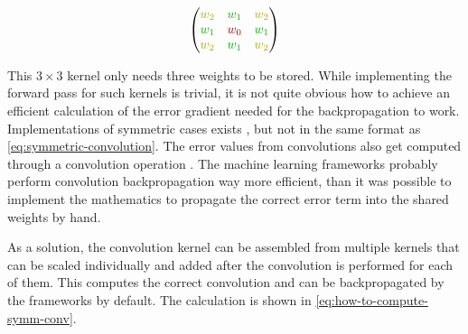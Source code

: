 \begin{equation}
    \label{eq:symmetric-convolution}
    \left(\begin{matrix}
        \textcolor{textyellow}{w_2} & \textcolor{textgreen}{w_1} & \textcolor{textyellow}{w_2}\\
        \textcolor{textgreen}{w_1} & \textcolor{textred}{w_0} & \textcolor{textgreen}{w_1}\\
        \textcolor{textyellow}{w_2} & \textcolor{textgreen}{w_1} & \textcolor{textyellow}{w_2}\\
    \end{matrix}\right)
\end{equation}

This $3\times 3$ kernel only needs three weights to be stored. 
While implementing the forward pass for such kernels is trivial, it is not quite obvious how to achieve an efficient calculation of the error gradient needed for the backpropagation to work.
Implementations of symmetric cases exists \cite{symmetricConvolutionImplementation}, but not in the same format as \autoref{eq:symmetric-convolution}.
The error values from convolutions also get computed through a convolution operation \cite{backpropagationInConvolutions}. 
The machine learning frameworks probably perform convolution backpropagation way more efficient, than it was possible to implement the mathematics to propagate the correct error term into the shared weights by hand.

As a solution, the convolution kernel can be assembled from multiple kernels that can be scaled individually and added after the convolution is performed for each of them.
This computes the correct convolution and can be backpropagated by the frameworks by default.
The calculation is shown in \autoref{eq:how-to-compute-symm-conv}.


